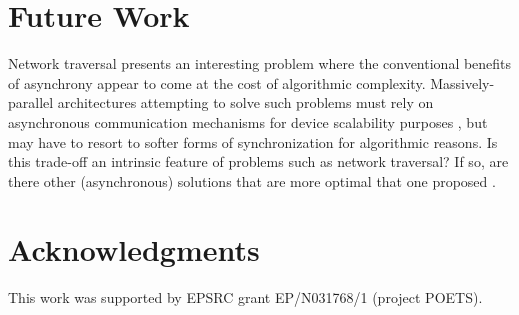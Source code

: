 \documentclass[conference]{IEEEtran}
\begin{document}
\section{Future Work}

Network traversal presents an interesting problem where the conventional
benefits of asynchrony appear to come at the cost of algorithmic complexity.
Massively-parallel architectures attempting to solve such problems must rely
on asynchronous communication mechanisms for device scalability purposes
\cite{parco2017}, but may have to resort to softer forms of synchronization
for algorithmic reasons. Is this trade-off an intrinsic feature of problems
such as network traversal? If so, are there other (asynchronous) solutions
that are more optimal that one proposed .

\newpage



\section*{Acknowledgments}

This work was supported by EPSRC grant EP/N031768/1 (project POETS).



\end{document}

